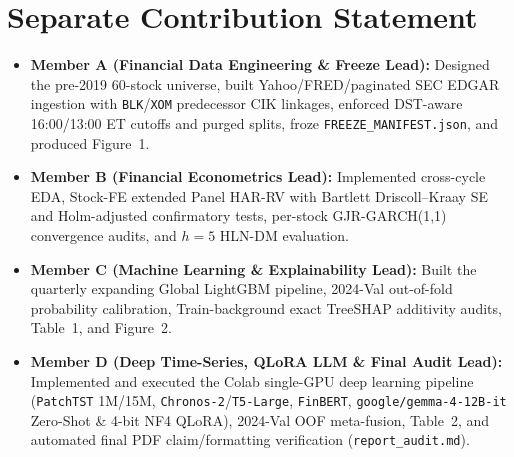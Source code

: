 \documentclass[11pt,a4paper]{article}
\begin{document}
\section*{Separate Contribution Statement}
\begin{itemize}\setlength{\itemsep}{2pt}
\item \textbf{Member A (Financial Data Engineering \& Freeze Lead):} Designed
the pre-2019 60-stock universe, built Yahoo/FRED/paginated SEC EDGAR ingestion
with \texttt{BLK}/\texttt{XOM} predecessor CIK linkages, enforced DST-aware
16:00/13:00 ET cutoffs and purged splits, froze \texttt{FREEZE\_MANIFEST.json},
and produced Figure~1.
\item \textbf{Member B (Financial Econometrics Lead):} Implemented cross-cycle
EDA, Stock-FE extended Panel HAR-RV with Bartlett Driscoll--Kraay SE and
Holm-adjusted confirmatory tests, per-stock GJR-GARCH(1,1) convergence audits,
and $h=5$ HLN-DM evaluation.
\item \textbf{Member C (Machine Learning \& Explainability Lead):} Built the
quarterly expanding Global LightGBM pipeline, 2024-Val out-of-fold probability
calibration, Train-background exact TreeSHAP additivity audits, Table~1, and
Figure~2.
\item \textbf{Member D (Deep Time-Series, QLoRA LLM \& Final Audit Lead):}
Implemented and executed the Colab single-GPU deep learning pipeline
(\texttt{PatchTST} 1M/15M, \texttt{Chronos-2}/\texttt{T5-Large},
\texttt{FinBERT}, \texttt{google/gemma-4-12B-it} Zero-Shot \& 4-bit NF4 QLoRA), 2024-Val
OOF meta-fusion, Table~2, and automated final PDF claim/formatting verification
(\texttt{report\_audit.md}).
\end{itemize}
\end{document}
